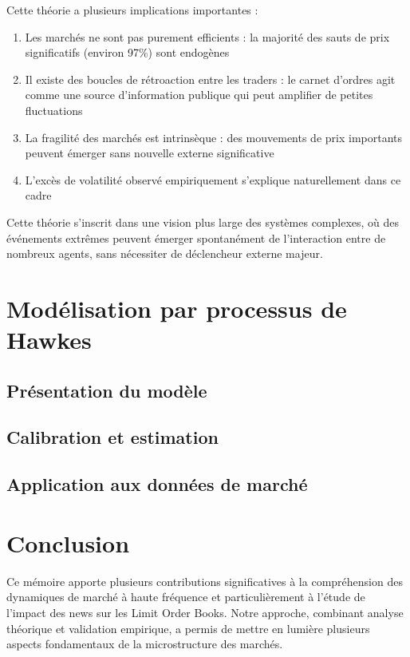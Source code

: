 \documentclass[12pt,a4paper]{article}
\theoremstyle{definition}
\theoremstyle{remark}
\begin{document}
Cette théorie a plusieurs implications importantes :

\begin{enumerate}
    \item Les marchés ne sont pas purement efficients : la majorité des sauts de prix significatifs (environ 97\%) sont endogènes
    \item Il existe des boucles de rétroaction entre les traders : le carnet d'ordres agit comme une source d'information publique qui peut amplifier de petites fluctuations
    \item La fragilité des marchés est intrinsèque : des mouvements de prix importants peuvent émerger sans nouvelle externe significative
    \item L'excès de volatilité observé empiriquement s'explique naturellement dans ce cadre
\end{enumerate}

Cette théorie s'inscrit dans une vision plus large des systèmes complexes, où des événements extrêmes peuvent émerger spontanément de l'interaction entre de nombreux agents, sans nécessiter de déclencheur externe majeur.

\section{Modélisation par processus de Hawkes}

\subsection{Présentation du modèle}

\subsection{Calibration et estimation}

\subsection{Application aux données de marché}

\section*{Conclusion}

Ce mémoire apporte plusieurs contributions significatives à la compréhension des dynamiques de marché à haute fréquence et particulièrement à l'étude de l'impact des news sur les Limit Order Books. Notre approche, combinant analyse théorique et validation empirique, a permis de mettre en lumière plusieurs aspects fondamentaux de la microstructure des marchés.
\end{document}
